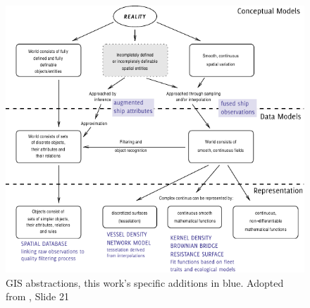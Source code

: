 


\begin{figure}[htbp]
  \centering
  \includegraphics[width=160mm]{figures/representation-in-gis.pdf}
  \caption{GIS abstractions, this work's specific {\color{DBlue} additions in blue}. Adopted from \cite{Bivand2011}, Slide 21}
  \label{fig:representation-in-gis}
\end{figure}



